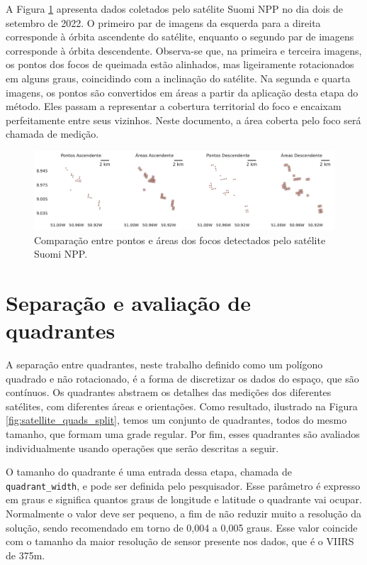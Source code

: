 \documentclass[cic,tc]{iiufrgs}
\begin{document}
A Figura \ref{fig:comparacao_pontos_e_areas} apresenta dados coletados pelo satélite Suomi NPP no dia dois de setembro de 2022. O primeiro par de imagens da esquerda para a direita corresponde à órbita ascendente do satélite, enquanto o segundo par de imagens corresponde à órbita descendente. Observa-se que, na primeira e terceira imagens, os pontos dos focos de queimada estão alinhados, mas ligeiramente rotacionados em alguns graus, coincidindo com a inclinação do satélite. Na segunda e quarta imagens, os pontos são convertidos em áreas a partir da aplicação desta etapa do método. Eles passam a representar a cobertura territorial do foco e encaixam perfeitamente entre seus vizinhos. Neste documento, a área coberta pelo foco será chamada de medição.

\begin{figure}[!htb]
    \caption{Comparação entre pontos e áreas dos focos detectados pelo satélite Suomi NPP.}
    \begin{center}
        \includegraphics[width=35em]{comparacao_pontos_e_areas}
    \end{center}
    \label{fig:comparacao_pontos_e_areas}
\end{figure}

\section{Separação e avaliação de quadrantes}
\label{sec:separacao_e_avaliacao}

A separação entre quadrantes, neste trabalho definido como um polígono quadrado e não rotacionado, é a forma de discretizar os dados do espaço, que são contínuos. Os quadrantes abstraem os detalhes das medições dos diferentes satélites, com diferentes áreas e orientações. Como resultado, ilustrado na Figura \ref{fig:satellite_quads_split}, temos um conjunto de quadrantes, todos do mesmo tamanho, que formam uma grade regular. Por fim, esses quadrantes são avaliados individualmente usando operações que serão descritas a seguir. 

O tamanho do quadrante é uma entrada dessa etapa, chamada de \texttt{quadrant\_width}, e pode ser definida pelo pesquisador. Esse parâmetro é expresso em graus e significa quantos graus de longitude e latitude o quadrante vai ocupar. Normalmente o valor deve ser pequeno, a fim de não reduzir muito a resolução da solução, sendo recomendado em torno de 0,004 a 0,005 graus. Esse valor coincide com o tamanho da maior resolução de sensor presente nos dados, que é o VIIRS de 375m.
\end{document}
